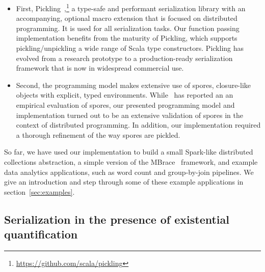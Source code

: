 \documentclass[preprint]{sigplanconf}
\theoremstyle{definition}
\theoremstyle{definition}
\begin{document}
\begin{itemize}

\item First, Pickling~\cite{Pickling},\footnote{\url{https://github.com/scala/pickling}}
  a type-safe and performant serialization library with an accompanying, optional
  macro extension that is focused on distributed programming. It is used for
  all serialization tasks. Our function passing implementation benefits from the maturity of
  Pickling, which supports pickling/unpickling a wide range of Scala type
  constructors. Pickling has evolved from a research prototype to a
  production-ready serialization framework that is now in widespread commercial
  use.

\item Second, the programming model makes extensive use of spores, closure-like
  objects with explicit, typed environments. While~\cite{Spores} has reported an
  an empirical evaluation of spores, our presented programming model and
  implementation turned out to be an extensive validation of spores in the context
  of distributed programming. In addition, our implementation required a thorough
  refinement of the way spores are pickled.

\end{itemize}

So far, we have used our implementation to build a small Spark-like distributed
collections abstraction, a simple version of the MBrace~\cite{MBrace} framework,
and example data analytics applications, such as word count and group-by-join
pipelines. We give an introduction and step through some of these example
applications in section~\ref{sec:examples}.



\subsection{Serialization in the presence of existential quantification}
\end{document}
